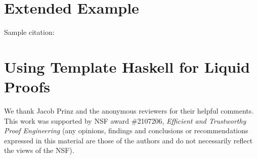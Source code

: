 \documentclass[sigplan,screen]{acmart}
\begin{document}


\maketitle




\section{Extended Example}


Sample citation: \cite{liu20typeclasses}

\section{Using Template Haskell for Liquid Proofs}


%



\begin{acks}
  We thank Jacob Prinz and the anonymous reviewers for their helpful
  comments.  This work was supported by NSF award \#2107206, {\em
    Efficient and Trustworthy Proof Engineering} (any opinions,
  findings and conclusions or recommendations expressed in this
  material are those of the authors and do not necessarily reflect the
  views of the NSF).
\end{acks}





\end{document}

